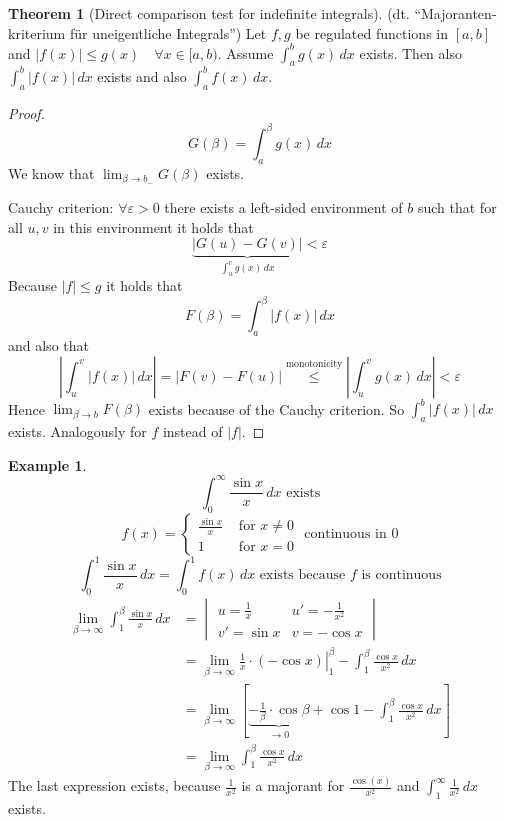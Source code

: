 \documentclass[a4paper,landscape,twocolumn]{article}
\theoremstyle{definition}
\newtheorem{theorem}{Theorem}
\newtheorem{ex}{Example}
\newcommand\abs[1]{\left|#1\right|}
\begin{document}
\begin{theorem}[Direct comparison test for indefinite integrals]
  (dt. \enquote{\foreignlanguage{ngerman}{Majorantenkriterium für uneigentliche Integrals}})
  Let $f,g$ be regulated functions in $[a,b]$ and $\abs{f(x)} \leq g(x) \quad \forall x \in [a,b)$.
  Assume $\int_a^b g(x) \, dx$ exists. Then also $\int_a^b \abs{f(x)} \, dx$ exists
  and also $\int_a^b f(x) \, dx$.
\end{theorem}

\begin{proof}
  \[ G(\beta) = \int_a^\beta g(x) \, dx \]
  We know that $\lim_{\beta\to b_-} G(\beta)$ exists.

  Cauchy criterion:
  $\forall \varepsilon > 0$ there exists a left-sided environment of $b$ such that
  for all $u,v$ in this environment it holds that
  \[ \underbrace{\abs{G(u) - G(v)}}_{\int_u^v g(x) \, dx} < \varepsilon \]
  Because $\abs{f} \leq g$ it holds that
  \[ F(\beta) = \int_a^\beta \abs{f(x)} \, dx \]
  and also that
  \[ \abs{\int_u^v \abs{f(x)} \, dx} = \abs{F(v) - F(u)} \overset{\text{monotonicity}}{\leq} \abs{\int_u^v g(x) \, dx} < \varepsilon\]
  Hence $\lim_{\beta\to b} F(\beta)$ exists because of the Cauchy criterion.
  So $\int_a^b \abs{f(x)} \, dx$ exists. Analogously for $f$ instead of $\abs{f}$.
\end{proof}

\begin{ex}
  \[ \int_0^\infty \frac{\sin{x}}{x} \, dx \text{ exists} \]
  \[
    f(x) = \begin{cases}
      \frac{\sin{x}}{x} & \text{ for } x \neq 0 \\
      1 & \text{ for } x = 0
    \end{cases}
    \text{ continuous in } 0
  \]
  \[ \int_0^1 \frac{\sin{x}}{x} \, dx = \int_0^1 f(x) \, dx \text{ exists because $f$ is continuous} \]
  \begin{align*}
    \lim_{\beta\to\infty} \int_1^\beta \frac{\sin{x}}{x} \, dx
    &= \begin{vmatrix}
      u = \frac1x & u' = -\frac1{x^2} \\
      v' = \sin{x} & v = -\cos{x}
    \end{vmatrix} \\
    &= \lim_{\beta\to\infty} \left.\frac1x \cdot (-\cos{x}) \right|_1^\beta - \int_1^\beta \frac{\cos{x}}{x^2} \, dx \\
    &= \lim_{\beta\to\infty} \left[ \underbrace{-\frac{1}{\beta} \cdot \cos{\beta}}_{\to 0} + \cos{1} - \int_1^\beta \frac{\cos{x}}{x^2} \, dx \right] \\
    &= \lim_{\beta\to\infty} \int_1^\beta \frac{\cos{x}}{x^2} \, dx
  \end{align*}
  The last expression exists, because $\frac1{x^2}$ is a majorant for $\frac{\cos(x)}{x^2}$ and $\int_1^\infty \frac{1}{x^2} \, dx$ exists.
\end{ex}
\end{document}
